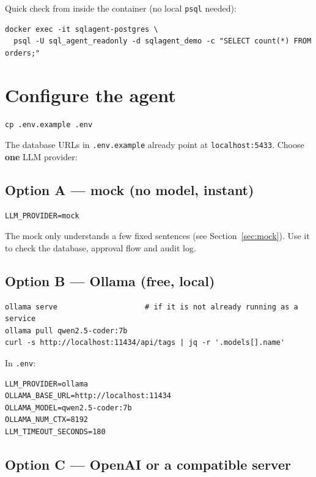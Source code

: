 \documentclass[11pt,a4paper]{article}
\begin{document}
Quick check from inside the container (no local \texttt{psql} needed):

\begin{lstlisting}
docker exec -it sqlagent-postgres \
  psql -U sql_agent_readonly -d sqlagent_demo -c "SELECT count(*) FROM orders;"
\end{lstlisting}

\section{Configure the agent}

\begin{lstlisting}
cp .env.example .env
\end{lstlisting}

The database URLs in \texttt{.env.example} already point at
\texttt{localhost:5433}. Choose \textbf{one} LLM provider:

\subsection{Option A --- mock (no model, instant)}

\begin{lstlisting}
LLM_PROVIDER=mock
\end{lstlisting}

The mock only understands a few fixed sentences (see Section~\ref{sec:mock}).
Use it to check the database, approval flow and audit log.

\subsection{Option B --- Ollama (free, local)}

\begin{lstlisting}
ollama serve                    # if it is not already running as a service
ollama pull qwen2.5-coder:7b
curl -s http://localhost:11434/api/tags | jq -r '.models[].name'
\end{lstlisting}

In \texttt{.env}:

\begin{lstlisting}
LLM_PROVIDER=ollama
OLLAMA_BASE_URL=http://localhost:11434
OLLAMA_MODEL=qwen2.5-coder:7b
OLLAMA_NUM_CTX=8192
LLM_TIMEOUT_SECONDS=180
\end{lstlisting}

\subsection{Option C --- OpenAI or a compatible server}
\end{document}
